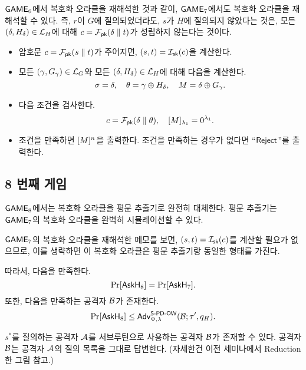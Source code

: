 \begin{memo}
	$\textsf{GAME}_6$에서 복호화 오라클을 재해석한 것과 같이, $\textsf{GAME}_7$에서도 복호화
	오라클을 재해석할 수 있다. 즉, $r$이 $G$에 질의되었더라도, $s$가 $H$에
	질의되지 않았다는 것은, 모든 $(\delta, H_{\delta}) \in \mathcal{L}_H$에 대해 $c =
	\mathcal{F}_{\textsf{pk}}(\delta \parallel t)$가 성립하지 않는다는 것이다. 
	\begin{tcolorbox}
		\begin{itemize}
			\item 암호문 $c = \mathcal{F}_{\textsf{pk}}(s \parallel t)$가 주어지면, $(s,t) =
			\mathcal{I}_{\textsf{sk}}(c)$을 계산한다.
			\item 모든 $(\gamma, G_\gamma) \in \mathcal{L}_G$와 모든 $(\delta,
			H_{\delta}) \in \mathcal{L}_H$에 대해 다음을 계산한다.
			$$
				\sigma = \delta, \quad \theta = \gamma \oplus H_{\delta}, \quad M = \delta \oplus G_{\gamma}.
			$$
			\item 다음 조건을 검사한다.
			$$
				c = \mathcal{F}_{\textsf{pk}}(\delta \parallel \theta), \quad [M]_{\lambda_1} = 0^{\lambda_1}.
			$$
			\item 조건을 만족하면 $[M]^{n}$을 출력한다. 조건을 만족하는
			경우가 없다면 “$\textsf{Reject}$”를 출력한다.
		\end{itemize}
	\end{tcolorbox}
\end{memo}

\newpage
\subsection{8 번째 게임}

$\textsf{GAME}_8$에서는 복호화 오라클을 평문 추출기로 완전히 대체한다. 평문 추출기는
$\textsf{GAME}_7$의 복호화 오라클을 완벽히 시뮬레이션할 수 있다. 

\begin{memo}
	$\textsf{GAME}_7$의 복호화 오라클을 재해석한 메모를 보면, $(s, t) = \mathcal{I}_{\textsf{sk}}(c)$를
	계산할 필요가 없으므로, 이를 생략하면 이 복호화 오라클은 평문 추출기랑
	동일한 형태를 가진다.
\end{memo}

따라서, 다음을 만족한다.
$$
	\Pr[\textsf{AskH}_8] = \Pr[\textsf{AskH}_7].
$$
또한, 다음을 만족하는 공격자 $\mathcal{B}$가 존재한다.
$$
	\Pr[\textsf{AskH}_8] \leq \textsf{Adv}^{\textsf{S-PD-OW}}_{\Psi, \lambda}(\mathcal{B}; \tau', q_{H}).
$$

\begin{memo}
	$s^*$를 질의하는 공격자 $\mathcal{A}$를 서브루틴으로 사용하는 공격자 $\mathcal{B}$가
	존재할 수 있다. 공격자 $\mathcal{B}$는 공격자 $\mathcal{A}$의 질의 목록을 그대로 답변한다.
	(자세한건 이전 세미나에서 Reduction한 그림 참고.)
\end{memo}

